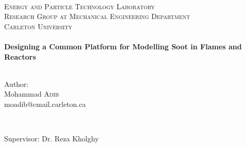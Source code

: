 \begin{titlepage}
\begin{center}

\newcommand{\myTitle}{Designing a Common Platform for Modelling Soot in Flames and Reactors}
\newcommand{\thisYear}{2023}



~\\[0.6cm]
\textsc{\LARGE Energy and Particle Technology Laboratory}\\[0.8cm]	
\textsc{Research Group at Mechanical Engineering Department }\\
\textsc{Carleton University}\\[0.6cm]	

~\\[0.5cm]
{ \huge \bfseries \myTitle}\\[0.2cm]
~\\[1cm]



\begin{minipage}{0.4\textwidth} \large
	\begin{center}
		Author:\\
		Mohammad \textsc{Adib}\\
		moadib@cmail.carleton.ca
	\end{center}
\end{minipage}

~\\[1cm]

\begin{minipage}{0.35\textwidth}
	Supervisor: Dr. Reza Kholghy\\
\end{minipage}\\[1.0cm]

~\\[1cm]


\vfill


\end{center}
\end{titlepage}
